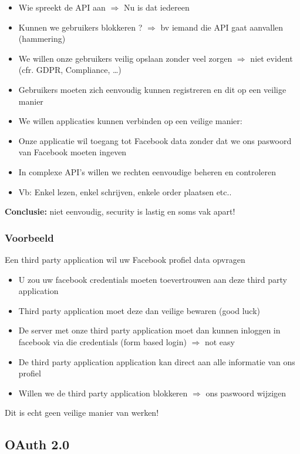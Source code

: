 \documentclass{article}
\begin{document}
\begin{itemize}
    \item Wie spreekt de API aan $\Rightarrow$ Nu is dat iedereen
    \item Kunnen we gebruikers blokkeren ? $\Rightarrow$ bv iemand die API gaat aanvallen (hammering)
    \item We willen onze gebruikers veilig opslaan zonder veel zorgen $\Rightarrow$ niet evident (cfr. GDPR, Compliance, \dots)
    \item Gebruikers moeten zich eenvoudig kunnen registreren en dit op een veilige manier
    \item We willen applicaties kunnen verbinden op een veilige manier:
    \item Onze applicatie wil toegang tot Facebook data zonder dat we ons paswoord van Facebook moeten ingeven
    \item In complexe API’s willen we rechten eenvoudige beheren en controleren
    \item Vb: Enkel lezen, enkel schrijven, enkele order plaatsen etc..
\end{itemize}

\textbf{Conclusie:} niet eenvoudig, security is lastig en soms vak apart!

\subsubsection{Voorbeeld}

Een third party application wil uw Facebook profiel data opvragen

\begin{itemize}
    \item U zou uw facebook credentials moeten toevertrouwen aan deze third party application
    \item Third party application moet deze dan veilige bewaren (good luck)
    \item De server met onze third party application moet dan kunnen inloggen in facebook via die credentials (form based login) $\Rightarrow$ not easy
    \item De third party application application kan direct aan alle informatie van ons profiel
    \item Willen we de third party application blokkeren $\Rightarrow$ ons paswoord wijzigen
\end{itemize}

Dit is echt geen veilige manier van werken!

\subsection{OAuth 2.0}
\end{document}
